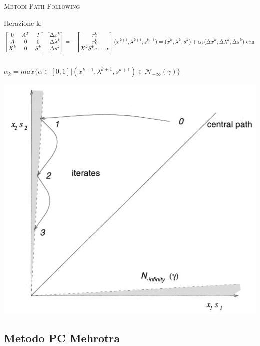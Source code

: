 
\begin{frame}[t]{\textsc{\LARGE \textcolor{burntumber}{Metodi Path-Following}}}
\begin{block}{Iterazione k:}
	\begin{equation*}	
	\begin{bmatrix}
	0&A^{T}&I \\A& 0&0\\X^{k}&0&S^{k}
	\end{bmatrix}\begin{bmatrix}
	\Delta x^{k}\\\Delta\lambda^{k} \\\Delta s^{k}
	\end{bmatrix}=-\begin{bmatrix}
	r_{c}^{k}\\r_{b}^{k}\\X^{k}S^{k}e-\tau e
	\end{bmatrix}\\
	(x^{k+1}, \lambda^{k+1}, s^{k+1}) = (x^{k}, \lambda^{k}, s^{k})+ \alpha_{k}(\Delta x^{k}, \Delta\lambda^{k}, \Delta s^{k}) \text{ con}
	\end{equation*}\\
	$ \alpha_{k} = max\{\alpha \in[0,1]|(x^{k+1}, \lambda^{k+1}, s^{k+1})\in\mathcal{N}_{-\infty}(\gamma)\}$
\end{block}
\pause
\centering \includegraphics[width = 4 cm]{LPF.PNG}	
\end{frame}


\subsection{Metodo PC Mehrotra}

